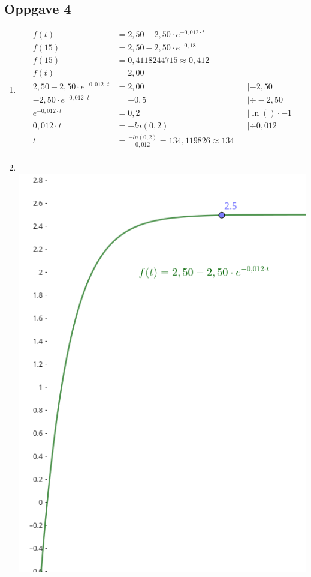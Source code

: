 \documentclass[11pt,a4paper]{report}
\newcommand{\m}{\cdot}
\newcommand{\opgd}[1]{\item[#1)]}
\newcommand{\opg}[1]{\subsection*{Oppgave #1}}
\begin{document}
\opg{4}
\begin{enumerate}[leftmargin=*,itemsep=1cm,labelsep=2em,label=\alph*)]
\opgd{a}
\begin{align*}
f(t) &= 2,50 - 2,50 \m e^{-0,012 \m t}\\
f(15) &= 2,50 - 2,50 \m e^{-0,18}\\
f(15) &= 0,4118244715 \approx 0,412\\
f(t) &= 2,00\\
2,50 - 2,50 \m e^{-0,012 \m t} &= 2,00 &&| -2,50\\
-2,50 \m e^{-0,012 \m t} &= -0,5 &&| \div -2,50\\
e^{-0,012 \m t} &= 0,2 &&| \ln() \m -1\\
0,012 \m t &= -ln(0,2) &&| \div 0,012\\[0.2 cm]
t &= \frac{-ln(0,2)}{0,012} = 134,119826 \approx 134\\
\end{align*}



\opgd{b} \ \\
\includegraphics[scale=0.4]{4b.png}\\\\


\end{enumerate}
\end{document}

